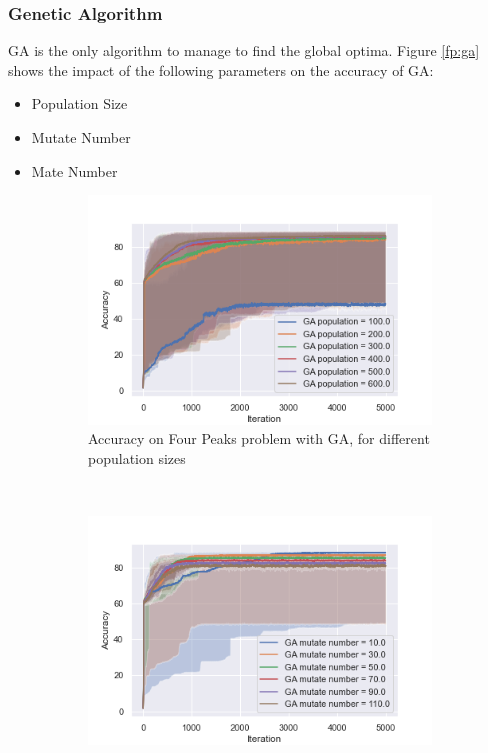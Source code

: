 \documentclass[twocolumn, 10pt]{article}
\begin{document}
			\subsubsection*{Genetic Algorithm}
				GA is the only algorithm to manage to find the global optima. Figure \ref{fp:ga} shows the impact of the following parameters on the accuracy of GA:
				\begin{itemize}
					\item Population Size
					\item Mutate Number
					\item Mate Number
				\end{itemize}

				\begin{figure}[h]
					\centering
					\begin{subfigure}[t]{0.32\columnwidth}
						\centering
						\includegraphics[width=\linewidth]{../graphics/four_peaks_GA_Iteration_Error_GA_population.png}
						\caption{Accuracy on Four Peaks problem with GA, for different population sizes}
						\label{fp:ga_pop}
					\end{subfigure}
					~
					\begin{subfigure}[t]{0.32\columnwidth}
						\centering
						\includegraphics[width=\linewidth]{../graphics/four_peaks_GA_Iteration_Error_GA_mutate_number.png}

\end{subfigure}
\end{figure}
\end{document}
